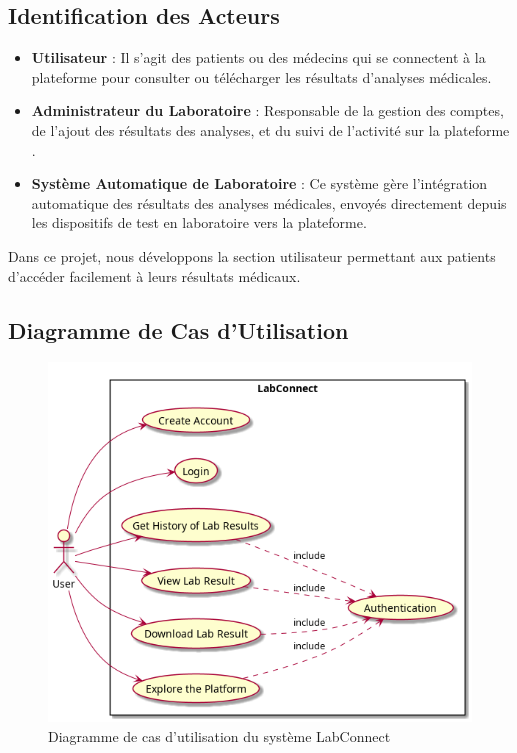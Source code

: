 \documentclass[12pt,a4paper]{report}
\begin{document}
\subsection{Identification des Acteurs}

\begin{itemize}
    \item \textbf{Utilisateur} : Il s’agit des patients ou des médecins qui se connectent à la plateforme pour consulter ou télécharger les résultats d'analyses médicales.
    
    \item \textbf{ Administrateur du Laboratoire} : Responsable de la gestion des comptes, de l'ajout des résultats des analyses, et du suivi de l'activité sur la plateforme .
    
    \item \textbf{Système Automatique de Laboratoire} : Ce système gère l'intégration automatique des résultats des analyses médicales, envoyés directement depuis les dispositifs de test en laboratoire vers la plateforme.
\end{itemize}
Dans ce projet, nous développons la section utilisateur permettant aux patients d'accéder facilement à leurs résultats médicaux. 
\subsection{Diagramme de Cas d'Utilisation}
\begin{figure}[h]
\includegraphics[width=\textwidth]{./img/diagram/UseCases/global.png}
\caption{Diagramme de cas d'utilisation du système LabConnect}
\label{fig:use-case}
\end{figure}
\end{document}
